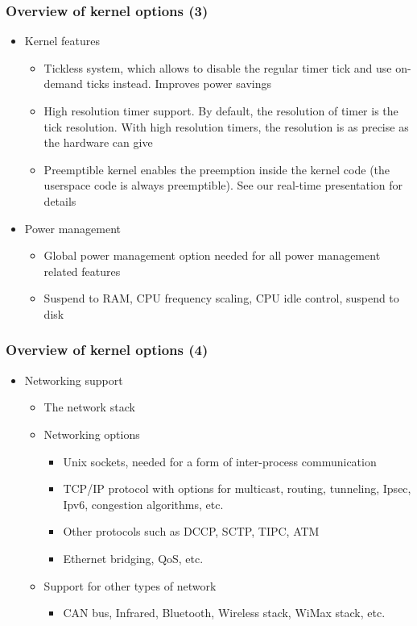 \begin{frame}
  \frametitle{Overview of kernel options (3)}
  \begin{itemize}
  \item Kernel features
    \begin{itemize}
    \item Tickless system, which allows to disable the regular timer
      tick and use on-demand ticks instead. Improves power savings
    \item High resolution timer support. By default, the resolution of
      timer is the tick resolution. With high resolution timers, the
      resolution is as precise as the hardware can give
    \item Preemptible kernel enables the preemption inside the kernel
      code (the userspace code is always preemptible). See our
      real-time presentation for details
    \end{itemize}
  \item Power management
    \begin{itemize}
    \item Global power management option needed for all power
      management related features
    \item Suspend to RAM, CPU frequency scaling, CPU idle control,
      suspend to disk
    \end{itemize}
  \end{itemize}
\end{frame}

\begin{frame}
  \frametitle{Overview of kernel options (4)}
  \begin{itemize}
  \item Networking support
    \begin{itemize}
    \item The network stack
    \item Networking options
      \begin{itemize}
      \item Unix sockets, needed for a form of inter-process
        communication
      \item TCP/IP protocol with options for multicast, routing,
        tunneling, Ipsec, Ipv6, congestion algorithms, etc.
      \item Other protocols such as DCCP, SCTP, TIPC, ATM
      \item Ethernet bridging, QoS, etc.
      \end{itemize}
    \item Support for other types of network
      \begin{itemize}
      \item CAN bus, Infrared, Bluetooth, Wireless stack, WiMax stack,
        etc.
      \end{itemize}
    \end{itemize}
  \end{itemize}
\end{frame}

